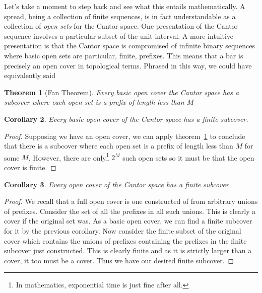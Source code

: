 \documentclass[12pt]{amsart}
\newtheorem{thm}{Theorem}[section]
\newtheorem{cor}[thm]{Corollary}
\begin{document}
Let's take a moment to step back and see what this entails
mathematically. A spread, being a collection of finite sequences, is
in fact understandable as a collection of \emph{open sets} for the
Cantor space. One presentation of the Cantor sequence involves a
particular subset of the unit interval. A more intuitive presentation
is that the Cantor space is compromised of infinite binary sequences
where basic open sets are particular, finite, prefixes. This means
that a bar is precisely an open cover in topological terms. Phrased in
this way, we could have equivalently said
\begin{thm}[Fan Theorem]\label{thm:intro:fan2}
  Every basic open cover the Cantor space has a subcover where each open set
  is a prefix of length less than $M$
\end{thm}
\begin{cor}
  Every basic open cover of the Cantor space has a finite subcover.
\end{cor}
\begin{proof}
  Supposing we have an open cover, we can apply
  theorem~\ref{thm:intro:fan2} to conclude that there is a subcover
  where each open set is a prefix of length less than $M$ for some
  $M$. However, there are only\footnote{In mathematics, exponential
    time is just fine after all.} $2^M$ such open sets so it must be
  that the open cover is finite.
\end{proof}
\begin{cor}
  Every open cover of the Cantor space has a finite subcover
\end{cor}
\begin{proof}
  We recall that a full open cover is one constructed of from
  arbitrary unions of prefixes. Consider the set of all the prefixes
  in all such unions. This is clearly a cover if the original set
  was. As a basic open cover, we can find a finite subcover for it by
  the previous corollary. Now consider the finite subset of the
  original cover which contains the unions of prefixes containing the
  prefixes in the finite subcover just constructed. This is clearly
  finite and as it is strictly larger than a cover, it too must be
  a cover. Thus we have our desired finite subcover.
\end{proof}
\end{document}
